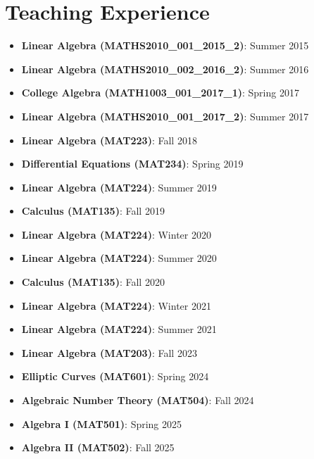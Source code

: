 \documentclass[a4paper,10pt]{article}
\begin{document}
\section*{Teaching Experience}
\begin{itemize}
    \item \textbf{Linear Algebra (MATHS2010\_001\_2015\_2)}: Summer 2015
    \item \textbf{Linear Algebra (MATHS2010\_002\_2016\_2)}: Summer 2016
    \item \textbf{College Algebra (MATH1003\_001\_2017\_1)}: Spring 2017
    \item \textbf{Linear Algebra (MATHS2010\_001\_2017\_2)}: Summer 2017
    \item \textbf{Linear Algebra (MAT223)}: Fall 2018
    \item \textbf{Differential Equations (MAT234)}: Spring 2019
    \item \textbf{Linear Algebra (MAT224)}: Summer 2019
    \item \textbf{Calculus (MAT135)}: Fall 2019
    \item \textbf{Linear Algebra (MAT224)}: Winter 2020
    \item \textbf{Linear Algebra (MAT224)}: Summer 2020
    \item \textbf{Calculus (MAT135)}: Fall 2020
    \item \textbf{Linear Algebra (MAT224)}: Winter 2021
    \item \textbf{Linear Algebra (MAT224)}: Summer 2021
    \item \textbf{Linear Algebra (MAT203)}: Fall 2023
    \item \textbf{Elliptic Curves (MAT601)}: Spring 2024
    \item \textbf{Algebraic Number Theory (MAT504)}: Fall 2024
    \item \textbf{Algebra I (MAT501)}: Spring 2025
    \item \textbf{Algebra II (MAT502)}: Fall 2025
\end{itemize}

\end{document}
